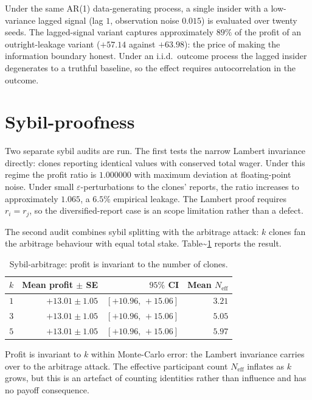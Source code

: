 \documentclass[
  11pt,
  a4paper,
  oneside]{report}
\begin{document}
Under the same AR(1) data-generating process, a single insider with a
low-variance lagged signal (lag \(1\), observation noise \(0.015\)) is
evaluated over twenty seeds. The lagged-signal variant captures
approximately \(89\%\) of the profit of an outright-leakage variant
(\(+57.14\) against \(+63.98\)): the price of making the information
boundary honest. Under an i.i.d.~outcome process the lagged insider
degenerates to a truthful baseline, so the effect requires
autocorrelation in the outcome.

\section{Sybil-proofness}\label{sybil-proofness}

Two separate sybil audits are run. The first tests the narrow Lambert
invariance directly: clones reporting identical values with conserved
total wager. Under this regime the profit ratio is \(1.000000\) with
maximum deviation at floating-point noise. Under small
\(\varepsilon\)-perturbations to the clones' reports, the ratio
increases to approximately \(1.065\), a \(6.5\%\) empirical leakage. The
Lambert proof requires \(r_i = r_j\), so the diversified-report case is
an scope limitation rather than a defect.

The second audit combines sybil splitting with the
\citet{chen2014arbitrage} arbitrage attack: \(k\) clones fan the
arbitrage behaviour with equal total stake.
Table\textasciitilde{}\ref{tab:sybil-arbitrage} reports the result.

\begin{table}[h]
\centering
\small
\begin{tabular}{rrrr}
\toprule
$k$ & Mean profit $\pm$ SE & $95\%$ CI & Mean $N_\mathrm{eff}$ \\
\midrule
$1$ & $+13.01 \pm 1.05$ & $[+10.96,\, +15.06]$ & $3.21$ \\
$3$ & $+13.01 \pm 1.05$ & $[+10.96,\, +15.06]$ & $5.05$ \\
$5$ & $+13.01 \pm 1.05$ & $[+10.96,\, +15.06]$ & $5.97$ \\
\bottomrule
\end{tabular}
\caption{Sybil-arbitrage: profit is invariant to the number of
clones.}
\label{tab:sybil-arbitrage}
\end{table}

Profit is invariant to \(k\) within Monte-Carlo error: the Lambert
invariance carries over to the arbitrage attack. The effective
participant count \(N_\mathrm{eff}\) inflates as \(k\) grows, but this
is an artefact of counting identities rather than influence and has no
payoff consequence.
\end{document}
